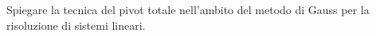 Spiegare la tecnica del pivot totale nell'ambito del metodo di 
Gauss per la risoluzione di sistemi lineari.
